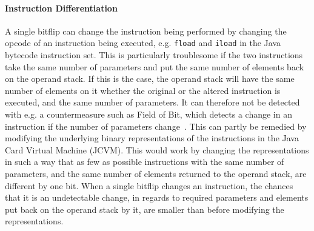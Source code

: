 \paragraph{Instruction Differentiation} 
A single bitflip can change the instruction being performed by changing the opcode of an instruction being executed, e.g. \texttt{fload} and \texttt{iload} in the Java bytecode instruction set. This is particularly troublesome if the two instructions take the same number of parameters and put the same number of elements back on the operand stack. If this is the case, the operand stack will have the same number of elements on it whether the original or the altered instruction is executed, and the same number of parameters. It can therefore not be detected with e.g. a countermeasure such as Field of Bit, which detects a change in an instruction if the number of parameters change~\cite[p. 16]{javasec}.
This can partly be remedied by modifying the underlying binary representations of the instructions in the Java Card Virtual Machine (JCVM).
This would work by changing the representations in such a way that as few as possible instructions with the same number of parameters, and the same number of elements returned to the operand stack, are different by one bit. 
When a single bitflip changes an instruction, the chances that it is an undetectable change, in regards to required parameters and elements put back on the operand stack by it, are smaller than before modifying the representations.

